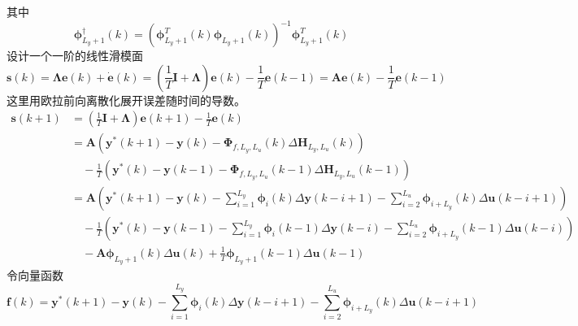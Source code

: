     其中
    \begin{equation}
    \boldsymbol{\phi}_{L_y+1}^\dagger(k) = \left( \boldsymbol{\phi}_{L_y+1}^T(k) \boldsymbol{\phi}_{L_y+1}(k) \right)^{-1} \boldsymbol{\phi}_{L_y+1}^T(k)
    \label{eq:phi_pinv}
    \end{equation}
    设计一个一阶的线性滑模面
    \begin{equation}
    \boldsymbol{s}(k) = \boldsymbol{\Lambda} \boldsymbol{e}(k) + \dot{\boldsymbol{e}}(k) = \left( \frac{1}{T} \boldsymbol{I} + \boldsymbol{\Lambda} \right) \boldsymbol{e}(k) - \frac{1}{T} \boldsymbol{e}(k - 1) = \boldsymbol{A} \boldsymbol{e}(k) - \frac{1}{T} \boldsymbol{e}(k - 1)
    \label{eq:first_order_surface}
    \end{equation}
    这里用欧拉前向离散化展开误差随时间的导数。
    \begin{equation}
    \begin{aligned}
    \boldsymbol{s}(k + 1) &= \left( \frac{1}{T} \boldsymbol{I} + \boldsymbol{\Lambda} \right) \boldsymbol{e}(k + 1) - \frac{1}{T} \boldsymbol{e}(k) \\
    &= \boldsymbol{A} \left( \boldsymbol{y}^*(k + 1) - \boldsymbol{y}(k) - \boldsymbol{\Phi}_{f,L_y,L_u}(k) \Delta \boldsymbol{H}_{L_y,L_u}(k) \right) \\
    &\quad - \frac{1}{T} \left( \boldsymbol{y}^*(k) - \boldsymbol{y}(k - 1) - \boldsymbol{\Phi}_{f,L_y,L_u}(k - 1) \Delta \boldsymbol{H}_{L_y,L_u}(k - 1) \right) \\
    &= \boldsymbol{A} \left( \boldsymbol{y}^*(k + 1) - \boldsymbol{y}(k) - \sum_{i=1}^{L_y} \boldsymbol{\phi}_i(k) \Delta \boldsymbol{y}(k - i + 1) - \sum_{i=2}^{L_u} \boldsymbol{\phi}_{i+L_y}(k) \Delta \boldsymbol{u}(k - i + 1) \right) \\
    &\quad - \frac{1}{T} \left( \boldsymbol{y}^*(k) - \boldsymbol{y}(k - 1) - \sum_{i=1}^{L_y} \boldsymbol{\phi}_i(k - 1) \Delta \boldsymbol{y}(k - i) - \sum_{i=2}^{L_u} \boldsymbol{\phi}_{i+L_y}(k - 1) \Delta \boldsymbol{u}(k - i) \right) \\
    &\quad - \boldsymbol{A} \boldsymbol{\phi}_{L_y+1}(k) \Delta \boldsymbol{u}(k) + \frac{1}{T} \boldsymbol{\phi}_{L_y+1}(k - 1) \Delta \boldsymbol{u}(k - 1)
    \end{aligned}
    \label{eq:first_order_surface_next}
    \end{equation}
    令向量函数
    \begin{equation}
    \boldsymbol{f}(k) = \boldsymbol{y}^*(k + 1) - \boldsymbol{y}(k) - \sum_{i=1}^{L_y} \boldsymbol{\phi}_i(k) \Delta \boldsymbol{y}(k - i + 1) - \sum_{i=2}^{L_u} \boldsymbol{\phi}_{i+L_y}(k) \Delta \boldsymbol{u}(k - i + 1)
    \label{eq:f_k}
    \end{equation}
